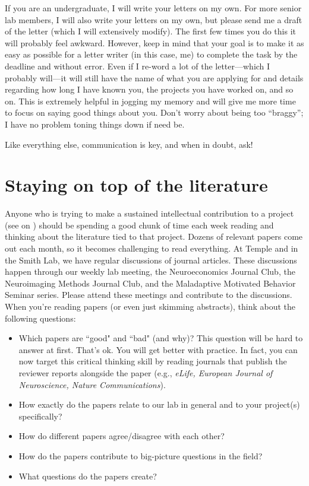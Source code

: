 \documentclass[letterpaper,11pt,oneside]{memoir}
\begin{document}
If you are an undergraduate, I will write your letters on my own. For more senior lab members, I will also write your letters on my own, but please send me a draft of the letter (which I will extensively modify). The first few times you do this it will probably feel awkward. However, keep in mind that your goal is to make it as easy as possible for a letter writer (in this case, me) to complete the task by the deadline and without error. Even if I re-word a lot of the letter---which I probably will---it will still have the name of what you are applying for and details regarding how long I have known you, the projects you have worked on, and so on. This is extremely helpful in jogging my memory and will give me more time to focus on saying good things about you. Don't worry about being too ``braggy''; I have no problem toning things down if need be.

Like everything else, communication is key, and when in doubt, ask!

\section{Staying on top of the literature}
\label{sec:literature}

Anyone who is trying to make a sustained intellectual contribution to a project (see  on ) should be spending a good chunk of time each week reading and thinking about the literature tied to that project. Dozens of relevant papers come out each month, so it becomes challenging to read everything. At Temple and in the Smith Lab, we have regular discussions of journal articles. These discussions happen through our weekly lab meeting, the Neuroeconomics Journal Club, the Neuroimaging Methods Journal Club, and the Maladaptive Motivated Behavior Seminar series. Please attend these meetings and contribute to the discussions. When you're reading papers (or even just skimming abstracts), think about the following questions:

\begin{itemize}
\item Which papers are ``good" and ``bad" (and why)? This question will be hard to answer at first. That's ok. You will get better with practice. In fact, you can now target this critical thinking skill by reading journals that publish the reviewer reports alongside the paper (e.g., \textit{eLife, European Journal of Neuroscience, Nature Communications}).
\item How exactly do the papers relate to our lab in general and to your project(s) specifically?
\item How do different papers agree/disagree with each other?
\item How do the papers contribute to big-picture questions in the field? 
\item What questions do the papers create?  
\end{itemize}
\end{document}
